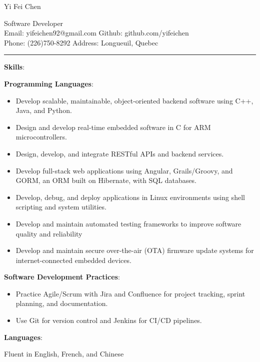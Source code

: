 \documentclass[letterpaper]{article}
\begin{document}
\begin{center}
\begin{LARGE}
 Yi Fei Chen \\
\end{LARGE}
\begin{large}
Software Developer\\
Email: yifeichen92@gmail.com
\hfill
Github: github.com/yifeichen \\
Phone: (226)750-8292 
\hfill	
Address: Longueuil, Quebec
\end{large}
\end{center}

\noindent\rule{\textwidth}{0.2pt}

\begin{large}
\textbf{Skills}:\\
\end{large}
\textbf{Programming Languages}:
\begin{itemize}[leftmargin=10mm]
\item Develop scalable, maintainable, object-oriented backend software using C++, Java, and Python.
\item Design and develop real-time embedded software in C for ARM microcontrollers.
\item Design, develop, and integrate RESTful APIs and backend services.
\item Develop full-stack web applications using Angular, Grails/Groovy, and GORM, an ORM built on Hibernate, with SQL databases.
\item Develop, debug, and deploy applications in Linux environments using shell scripting and system utilities.
\item Develop and maintain automated testing frameworks to improve software quality and reliability
\item Develop and maintain secure over-the-air (OTA) firmware update systems for internet-connected embedded devices.
\end{itemize}
\textbf{Software Development Practices}:
\begin{itemize}[leftmargin=10mm]
\item Practice Agile/Scrum with Jira and Confluence for project tracking, sprint planning, and documentation.
\item Use Git for version control and Jenkins for CI/CD pipelines.
\end{itemize}
\textbf{Languages}:

 Fluent in English, French, and Chinese\\
\end{document}
